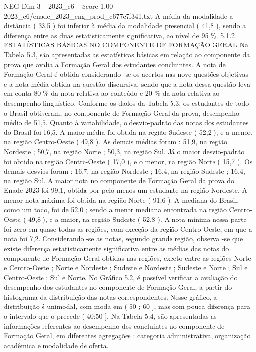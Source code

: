 \begin{textsample}{NEG Dim 3 – 2023\_c6 – Score 1.00 – 2023\_c6/enade\_2023\_eng\_prod\_c677c7f341.txt}
A média da modalidade a distância ( 33,5 ) foi inferior à média da modalidade presencial ( 41,8 ), sendo a diferença entre as duas estatisticamente significativa, ao nível de 95 \%. 5.1.2 ESTATÍSTICAS BÁSICAS NO COMPONENTE DE FORMAÇÃO GERAL Na Tabela 5.3, são apresentadas as estatísticas básicas em relação ao componente da prova que avalia a Formação Geral dos estudantes concluintes.
A nota de Formação Geral é obtida considerando -se os acertos nas nove questões objetivas e a nota média obtida na questão discursiva, sendo que a nota dessa questão leva em conta 80 \% da nota relativa ao conteúdo e 20 \% da nota relativa ao desempenho linguístico.
Conforme os dados da Tabela 5.3, os estudantes de todo o Brasil obtiveram, no componente de Formação Geral da prova, desempenho médio de 51,6.
Quanto à variabilidade, o desvio-padrão das notas dos estudantes do Brasil foi 16,5.
A maior média foi obtida na região Sudeste ( 52,2 ), e a menor, na região Centro-Oeste ( 49,8 ).
As demais médias foram : 51,9, na região Nordeste ; 50,7, na região Norte ; 50,3, na região Sul.
Já o maior desvio-padrão foi obtido na região Centro-Oeste ( 17,0 ), e o menor, na região Norte ( 15,7 ).
Os demais desvios foram : 16,7, na região Nordeste ; 16,4, na região Sudeste ; 16,4, na região Sul.
A maior nota no componente de Formação Geral da prova do Enade 2023 foi 99,1, obtida por pelo menos um estudante na região Nordeste.
A menor nota máxima foi obtida na região Norte ( 91,6 ).
A mediana do Brasil, como um todo, foi de 52,0 ; sendo a menor mediana encontrada na região Centro-Oeste ( 49,8 ), e a maior, na região Sudeste ( 52,8 ).
A nota mínima nessa parte foi zero em quase todas as regiões, com exceção da região Centro-Oeste, em que a nota foi 7,2.
Considerando -se as notas, segundo grande região, observa -se que existe diferença estatisticamente significativa entre as médias das notas do componente de Formação Geral obtidas nas regiões, exceto entre as regiões Norte e Centro-Oeste ; Norte e Nordeste ; Sudeste e Nordeste ; Sudeste e Norte ; Sul e Centro-Oeste ; Sul e Norte.
No Gráfico 5.2, é possível verificar a avaliação do desempenho dos estudantes no componente de Formação Geral, a partir do histograma da distribuição das notas correspondentes.
Nesse gráfico, a distribuição é unimodal, com moda em ( 50 ; 60 ], mas com pouca diferença para o intervalo que o precede ( 40:50 ].
Na Tabela 5.4, são apresentadas as informações referentes ao desempenho dos concluintes no componente de Formação Geral, em diferentes agregações : categoria administrativa, organização acadêmica e modalidade de oferta.

\end{textsample}
